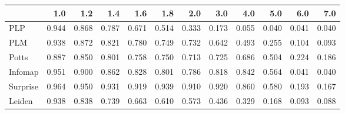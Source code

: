 \begin{tabular}{lrrrrrrrrrrr}
\toprule
{} &   1.0 &   1.2 &   1.4 &   1.6 &   1.8 &   2.0 &   3.0 &   4.0 &   5.0 &   6.0 &   7.0 \\
\midrule
PLP      & 0.944 & 0.868 & 0.787 & 0.671 & 0.514 & 0.333 & 0.173 & 0.055 & 0.040 & 0.041 & 0.040 \\
PLM      & 0.938 & 0.872 & 0.821 & 0.780 & 0.749 & 0.732 & 0.642 & 0.493 & 0.255 & 0.104 & 0.093 \\
Potts    & 0.887 & 0.850 & 0.801 & 0.758 & 0.750 & 0.713 & 0.725 & 0.686 & 0.504 & 0.224 & 0.186 \\
Infomap  & 0.951 & 0.900 & 0.862 & 0.828 & 0.801 & 0.786 & 0.818 & 0.842 & 0.564 & 0.041 & 0.040 \\
Surprise & 0.964 & 0.950 & 0.931 & 0.919 & 0.939 & 0.910 & 0.920 & 0.860 & 0.580 & 0.193 & 0.167 \\
Leiden   & 0.938 & 0.838 & 0.739 & 0.663 & 0.610 & 0.573 & 0.436 & 0.329 & 0.168 & 0.093 & 0.088 \\
\bottomrule
\end{tabular}
